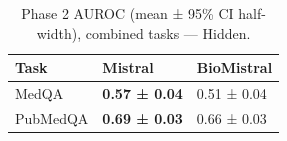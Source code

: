 \begin{table}
\caption{Phase 2 AUROC (mean ± 95\% CI half-width), combined tasks — Hidden.}
\label{tab:phase2_auroc_all_hidden_probe_oof}
\begin{tabular}{lll}
\toprule
Task & Mistral & BioMistral \\
\midrule
MedQA & \textbf{0.57 ± 0.04} & 0.51 ± 0.04 \\
PubMedQA & \textbf{0.69 ± 0.03} & 0.66 ± 0.03 \\
\bottomrule
\end{tabular}
\end{table}
